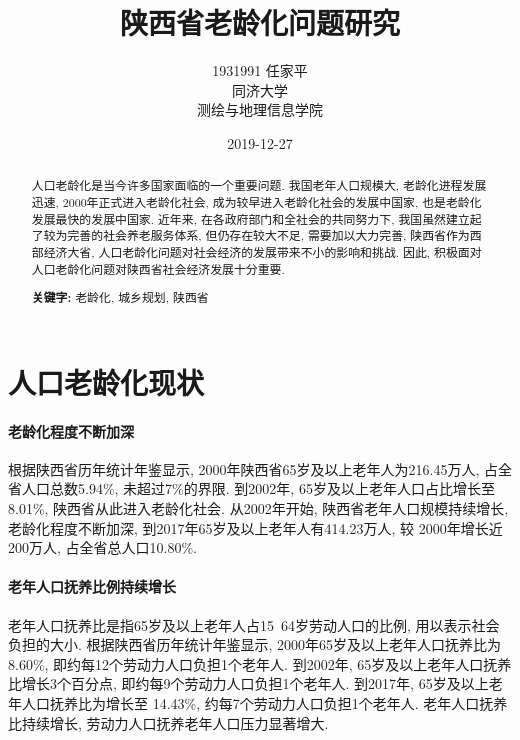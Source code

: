 \documentclass[a4paper, 12pt, UTF8]{article}
\begin{document}
\title{\Huge 陕西省老龄化问题研究}
\author{\Large 
        1931991 任家平 \\[12pt]
        同济大学 \\[12pt]
        测绘与地理信息学院}
\date{2019-12-27}
\maketitle
\thispagestyle{empty}

\newpage
\renewcommand\abstractname{\Large\textbf{摘要}}
\begin{abstract}

    人口老龄化是当今许多国家面临的一个重要问题. 我国老年人口规模大, 老龄化进程发展迅速, 2000年正式进入老龄化社会, 成为较早进入老龄化社会的发展中国家, 也是老龄化发展最快的发展中国家. 近年来, 在各政府部门和全社会的共同努力下, 我国虽然建立起了较为完善的社会养老服务体系, 但仍存在较大不足, 需要加以大力完善, 陕西省作为西部经济大省, 人口老龄化问题对社会经济的发展带来不小的影响和挑战. 因此, 积极面对人口老龄化问题对陕西省社会经济发展十分重要.  

    \par\textbf{关键字:} 老龄化, 城乡规划, 陕西省

\end{abstract}
\thispagestyle{empty}

\newpage
{}
\tableofcontents

\newpage
{}
\section{人口老龄化现状}
\paragraph{老龄化程度不断加深}

根据陕西省历年统计年鉴显示, 2000年陕西省65岁及以上老年人为216.45万人, 占全省人口总数5.94\%, 未超过7\%的界限. 到2002年, 65岁及以上老年人口占比增长至8.01\%, 陕西省从此进入老龄化社会. 从2002年开始, 陕西省老年人口规模持续增长, 老龄化程度不断加深, 到2017年65岁及以上老年人有414.23万人, 较 2000年增长近200万人, 占全省总人口10.80\%.  

\paragraph{老年人口抚养比例持续增长}

老年人口抚养比是指65岁及以上老年人占15~64岁劳动人口的比例, 用以表示社会负担的大小. 根据陕西省历年统计年鉴显示, 2000年65岁及以上老年人口抚养比为 8.60\%, 即约每12个劳动力人口负担1个老年人. 到2002年, 65岁及以上老年人口抚养比增长3个百分点, 即约每9个劳动力人口负担1个老年人. 到2017年, 65岁及以上老年人口抚养比为增长至 14.43\%, 约每7个劳动力人口负担1个老年人. 老年人口抚养比持续增长, 劳动力人口抚养老年人口压力显著增大.  
\end{document}

